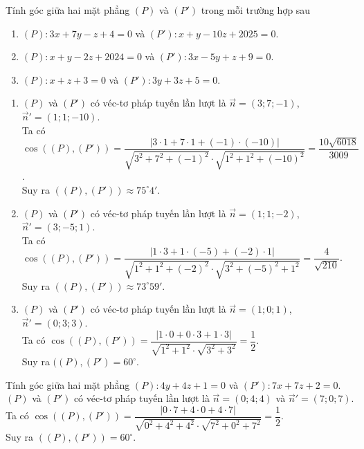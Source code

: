 \begin{vd}%
	Tính góc giữa hai mặt phẳng $(P)$ và $(P')$ trong mỗi trường hợp sau
	\begin{enumerate}
		\item $(P)\colon 3x+7y-z+4=0$ và $(P')\colon x+y-10z+2025=0$.
		\item $(P)\colon x+y-2z+2024=0$ và $(P')\colon 3x-5y+z+9=0$.
		\item $(P)\colon x+z+3=0$ và $(P')\colon 3y+3z+5=0$.
	\end{enumerate}
	\loigiai
	{
		\begin{enumerate}
			\item $(P)$ và $(P')$ có véc-tơ pháp tuyến lần lượt là $\overrightarrow{n}=(3;7;-1)$, $\overrightarrow{n}'=(1;1;-10)$.\\
			Ta có $\cos\left ((P),(P') \right )=\dfrac{\left |3\cdot 1+7\cdot 1+(-1)\cdot (-10) \right |}{\sqrt{3^2+7^2+(-1)^2}\cdot\sqrt{1^2+1^2+(-10)^2}}=\dfrac{10\sqrt{6018}}{3009}$.\\
			Suy ra $((P),(P'))\approx 75^{\circ}4'$.
			\item $(P)$ và $(P')$ có véc-tơ pháp tuyến lần lượt là $\overrightarrow{n}=(1;1;-2)$, $\overrightarrow{n}'=(3;-5;1)$.\\
			Ta có $\cos\left ((P),(P') \right )=\dfrac{\left |1\cdot 3+1\cdot (-5)+(-2)\cdot 1 \right |}{\sqrt{1^2+1^2+(-2)^2}\cdot\sqrt{3^2+(-5)^2+1^2}}=\dfrac{4}{\sqrt{210}}$.\\
			Suy ra $((P),(P'))\approx 73^{\circ}59'$.
			\item $(P)$ và $(P')$ có véc-tơ pháp tuyến lần lượt là $\overrightarrow{n}=(1;0;1)$, $\overrightarrow{n}'=(0;3;3)$.\\
			Ta có $\cos\left ((P),(P') \right )=\dfrac{\left |1\cdot 0+0\cdot 3+1\cdot 3 \right |}{\sqrt{1^2+1^2}\cdot\sqrt{3^2+3^2}}=\dfrac{1}{2}$.\\
			Suy ra $((P),(P')=60^{\circ}$.
		\end{enumerate}
	}
\end{vd}

\begin{bt}[Mức độ 1]%
	Tính góc giữa hai mặt phẳng $(P)\colon 4y+4z+1=0$ và $(P')\colon 7x+7z+2=0$.
	\loigiai
	{
		$(P)$ và $(P')$ có véc-tơ pháp tuyến lần lượt là $\overrightarrow{n}=(0;4;4)$ và $\overrightarrow{n}'=(7;0;7)$.\\
		Ta có $\cos \left ((P),(P') \right )=\dfrac{\left |0\cdot 7+4\cdot 0+4\cdot 7 \right |}{\sqrt{0^2+4^2+4^2}\cdot\sqrt{7^2+0^2+7^2}}=\dfrac{1}{2}$.\\
		Suy ra $\left ((P),(P') \right )=60^{\circ}$.
	}
\end{bt}

